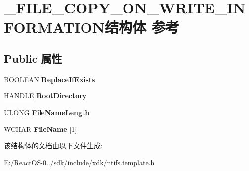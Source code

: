 \hypertarget{struct___f_i_l_e___c_o_p_y___o_n___w_r_i_t_e___i_n_f_o_r_m_a_t_i_o_n}{}\section{\+\_\+\+F\+I\+L\+E\+\_\+\+C\+O\+P\+Y\+\_\+\+O\+N\+\_\+\+W\+R\+I\+T\+E\+\_\+\+I\+N\+F\+O\+R\+M\+A\+T\+I\+O\+N结构体 参考}
\label{struct___f_i_l_e___c_o_p_y___o_n___w_r_i_t_e___i_n_f_o_r_m_a_t_i_o_n}
\subsection*{Public 属性}
\begin{DoxyCompactItemize}
\item 
\mbox{\label{struct___f_i_l_e___c_o_p_y___o_n___w_r_i_t_e___i_n_f_o_r_m_a_t_i_o_n_a4b797e9c57f4e47a4145ead41c21718e}} 
\hyperlink{_processor_bind_8h_a112e3146cb38b6ee95e64d85842e380a}{B\+O\+O\+L\+E\+AN} {\bfseries Replace\+If\+Exists}
\item 
\mbox{\label{struct___f_i_l_e___c_o_p_y___o_n___w_r_i_t_e___i_n_f_o_r_m_a_t_i_o_n_a42629ecea9e524d658ab13e68f0f061d}} 
\hyperlink{interfacevoid}{H\+A\+N\+D\+LE} {\bfseries Root\+Directory}
\item 
\mbox{\label{struct___f_i_l_e___c_o_p_y___o_n___w_r_i_t_e___i_n_f_o_r_m_a_t_i_o_n_a95ce20ef2a4a58e91bcb15a8d26c563e}} 
U\+L\+O\+NG {\bfseries File\+Name\+Length}
\item 
\mbox{\label{struct___f_i_l_e___c_o_p_y___o_n___w_r_i_t_e___i_n_f_o_r_m_a_t_i_o_n_a59604d33de705b21151842a7bd267592}} 
W\+C\+H\+AR {\bfseries File\+Name} \mbox{[}1\mbox{]}
\end{DoxyCompactItemize}


该结构体的文档由以下文件生成\+:\begin{DoxyCompactItemize}
\item 
E\+:/\+React\+O\+S-\/0../sdk/include/xdk/ntifs.\+template.\+h\end{DoxyCompactItemize}
